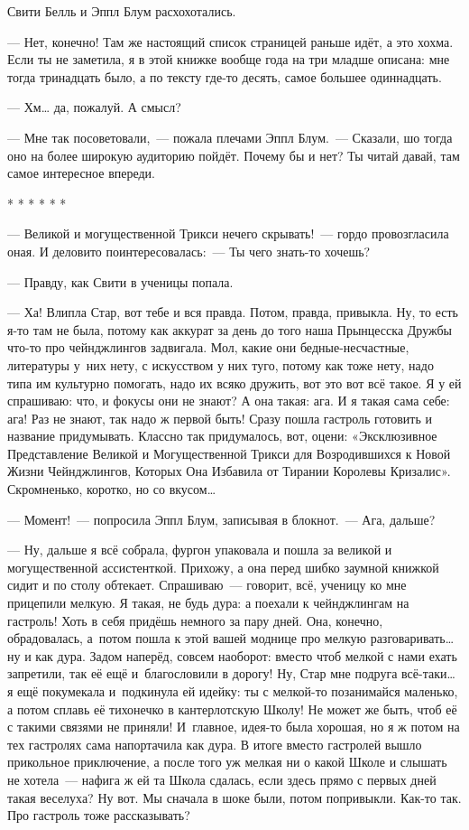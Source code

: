 \documentclass[fontsize=11pt,a5paper,titlepage=firstcover]{scrbook}
\begin{document}
Свити Белль и Эппл Блум расхохотались.

--- Нет, конечно! Там же настоящий список страницей раньше идёт, а это хохма. Если ты не заметила, я в этой книжке вообще года на три младше описана: мне тогда тринадцать было, а по тексту где-то десять, самое большее одиннадцать.

--- Хм{\ldots} да, пожалуй. А смысл?

--- Мне так посоветовали,~--- пожала плечами Эппл Блум.~--- Сказали, шо тогда оно на более широкую аудиторию пойдёт. Почему бы и нет? Ты читай давай, там самое интересное впереди.
\begin{center}
	* * * * * *
\end{center}

--- Великой и могущественной Трикси нечего скрывать!~--- гордо провозгласила оная. И деловито поинтересовалась:~--- Ты чего знать-то хочешь?

--- Правду, как Свити в ученицы попала.

--- Ха! Влипла Стар, вот тебе и вся правда. Потом, правда, привыкла. Ну, то есть я-то там не была, потому как аккурат за день до того наша Прынцесска Дружбы что-то про чейнджлингов задвигала. Мол, какие они бедные-несчастные, литературы у~них нету, с искусством у них туго, потому как тоже нету, надо типа им культурно помогать, надо их всяко дружить, вот это вот всё такое. Я у ей спрашиваю: что, и фокусы они не знают? А она такая: ага. И я такая сама себе: ага! Раз не знают, так надо ж первой быть! Сразу пошла гастроль готовить и название придумывать. Классно так придумалось, вот, оцени: «Эксклюзивное Представление Великой и Могущественной Трикси для Возродившихся к Новой Жизни Чейнджлингов, Которых Она Избавила от Тирании Королевы Кризалис». Скромненько, коротко, но со вкусом{\ldots}

--- Момент!~--- попросила Эппл Блум, записывая в блокнот.~--- Ага, дальше?

--- Ну, дальше я всё собрала, фургон упаковала и пошла за великой и могущественной ассистенткой. Прихожу, а она перед шибко заумной книжкой сидит и по столу обтекает. Спрашиваю~--- говорит, всё, ученицу ко мне прицепили мелкую. Я такая, не будь дура: а поехали к чейнджлингам на гастроль! Хоть в себя придёшь немного за пару дней. Она, конечно, обрадовалась, а~потом пошла к этой вашей моднице про мелкую разговаривать{\ldots} ну и как дура. Задом наперёд, совсем наоборот: вместо чтоб мелкой с нами ехать запретили, так её ещё и~благословили в дорогу! Ну, Стар мне подруга всё-таки{\ldots} я ещё покумекала и~подкинула ей идейку: ты с мелкой-то позанимайся маленько, а потом сплавь её тихонечко в кантерлотскую Школу! Не может же быть, чтоб её с такими связями не приняли! И~главное, идея-то была хорошая, но я ж потом на тех гастролях сама напортачила как дура. В итоге вместо гастролей вышло прикольное приключение, а после того уж мелкая ни о какой Школе и слышать не хотела~--- нафига ж ей та Школа сдалась, если здесь прямо с первых дней такая веселуха? Ну вот. Мы сначала в шоке были, потом попривыкли. Как-то так. Про гастроль тоже рассказывать?
\end{document}
